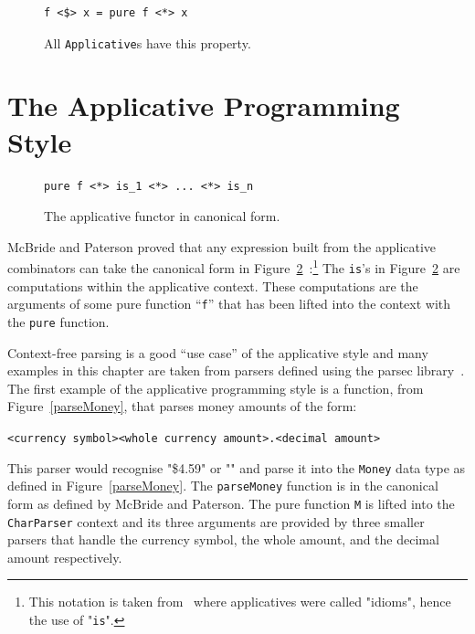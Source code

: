 \begin{figure}[t]
\begin{lstlisting}
f <$> x = pure f <*> x
\end{lstlisting}
\caption{All \texttt{Applicative}s have this property.}
\label{fmapLaw}
\end{figure}

 


\section{The Applicative Programming Style}
\label{sec:appProgStyle}

\begin{figure}[t]
\begin{lstlisting}
pure f <*> is_1 <*> ... <*> is_n
\end{lstlisting}
\caption{The applicative functor in canonical form.}
\label{canonForm}
\end{figure}

McBride and Paterson proved that any expression built from the applicative combinators can take the canonical form in Figure~\ref{canonForm}~\citep{mcbrideIdioms}:\footnote{This notation is taken from~\citep{mcbrideIdioms} where applicatives were called "idioms", hence the use of "\texttt{is}".} The \texttt{is}'s in Figure~\ref{canonForm} are computations within the applicative context. These computations are the arguments of some pure function ``\texttt{f}'' that has been lifted into the context with the \texttt{pure} function. 

Context-free parsing is a good ``use case'' of the applicative style and many examples in this chapter are taken from parsers defined using the parsec library~\citep{parsec}. The first example of the applicative programming style is a function, from Figure~\ref{parseMoney}, that parses money amounts of the form:
 
 \texttt{<currency symbol><whole currency amount>.<decimal amount>}
  
This parser would recognise "\$4.59" or "" and parse it into the \texttt{Money} data type as defined in Figure~\ref{parseMoney}. The \texttt{parseMoney} function is in the canonical form as defined by McBride and Paterson. The pure function \texttt{M} is lifted into the \texttt{CharParser} context and its three arguments are provided by three smaller parsers that handle the currency symbol, the whole amount, and the decimal amount respectively. 


